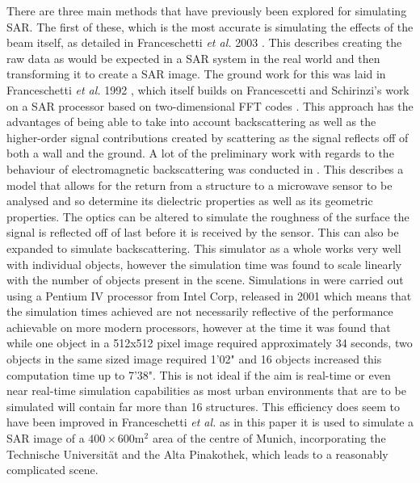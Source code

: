 There are three main methods that have previously been explored for simulating SAR. The first of these, which is the most accurate is simulating the effects of the beam itself, as detailed in Franceschetti \textit{et al.} 2003 \cite{franceschettiSARRawSignal2003}. This describes creating the raw data as would be expected in a SAR system in the real world and then transforming it to create a SAR image. The ground work for this was laid in Franceschetti \textit{et al.} 1992 \cite{franceschettiSARASSyntheticAperture1992}, which itself builds on Francescetti and Schirinzi's work on a SAR processor based on two-dimensional FFT codes \cite{franceschettiSARProcessorBased1990}. This approach has the advantages of being able to take into account backscattering as well as the higher-order signal contributions created by scattering as the signal reflects off of both a wall and the ground. A lot of the preliminary work with regards to the behaviour of electromagnetic backscattering was conducted in \cite{franceschettiCanonicalProblemElectromagnetic2002}. This describes a model that allows for the return from a structure to a microwave sensor to be analysed and so determine its dielectric properties as well as its geometric properties. The optics can be altered to simulate the roughness of the surface the signal is reflected off of last before it is received by the sensor. This can also be expanded to simulate backscattering. This simulator as a whole works very well with individual objects, however the simulation time was found to scale linearly with the number of objects present in the scene. Simulations in \cite{franceschettiSARRawSignal2003} were carried out using a Pentium IV processor from Intel Corp, released in 2001 which means that the simulation times achieved are not necessarily reflective of the performance achievable on more modern processors, however at the time it was found that while one object in a 512x512 pixel image required approximately 34 seconds, two objects in the same sized image required 1'02" and 16 objects increased this computation time up to 7'38". This is not ideal if the aim is real-time or even near real-time simulation capabilities as most urban environments that are to be simulated will contain far more than 16 structures. This efficiency does seem to have been improved in Franceschetti \textit{et al.} \cite{franceschettiSimulationToolsInterpretation2007} as in this paper it is used to simulate a SAR image of a $400\times 600 \textrm{m}^2$ area of the centre of Munich, incorporating the Technische Universität and the Alta Pinakothek, which leads to a reasonably complicated scene.  \par 
